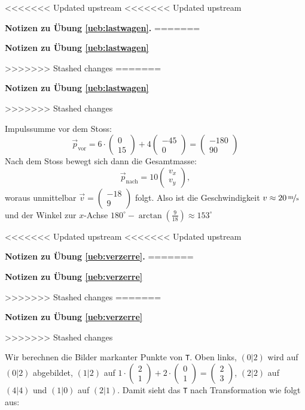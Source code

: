 \documentclass[%
11pt,%
twoside,%
titlepage,%
<<<<<<< Updated upstream
<<<<<<< Updated upstream
german,%
=======
swissgerman,%
>>>>>>> Stashed changes
=======
swissgerman,%
>>>>>>> Stashed changes
headsepline%
]{scrartcl}
\newcommand{\faReturnGray}{\textcolor{gray}{\faMailReply}} %
\newcommand{\faReturnGray}{\textcolor{gray}{\faMailReply}} %
\theoremstyle{definition}
\theoremstyle{plain}
\newcommand{\concatueb}[1]{ueb:#1}%
\newcommand{\concatlsg}[1]{lsg:#1}%
\newenvironment{lsg}[1]{%
<<<<<<< Updated upstream
<<<<<<< Updated upstream
    \par\noindent\textbf{Notizen zu Übung \ref{\concatueb{#1}}.}%
    \label{\concatlsg{#1}}
=======
    \par\noindent\textbf{Notizen zu Übung \ref{\concatueb{#1}}}\label{\concatlsg{#1}}
    \hfill\hyperref[\concatueb{#1}]{\faReturnGray}\par %
>>>>>>> Stashed changes
=======
    \par\noindent\textbf{Notizen zu Übung \ref{\concatueb{#1}}}\label{\concatlsg{#1}}
    \hfill\hyperref[\concatueb{#1}]{\faReturnGray}\par %
>>>>>>> Stashed changes
}{%
    \par%
}
\begin{document}
\begin{lsg}{lastwagen}
    Impulssumme vor dem Stoss:
    $$\vec{p}_{\text{vor}}=6\cdot\begin{pmatrix}
        0\\15
    \end{pmatrix}+4\begin{pmatrix}
        -45\\0
    \end{pmatrix}=\begin{pmatrix}
        -180\\90
    \end{pmatrix}$$
    Nach dem Stoss bewegt sich dann die Gesamtmasse:
    $$\vec{p}_{\text{nach}}=10\begin{pmatrix}
        v_x\\ v_y
    \end{pmatrix},$$
    woraus unmittelbar $\vec{v}=\begin{pmatrix}
        -18\\9
    \end{pmatrix}$ folgt. Also ist die Geschwindigkeit $v\approx\unitfrac[20]{m}{s}$ und der Winkel zur $x$-Achse $180^\circ-\arctan(\frac{9}{18})\approx153^\circ$
\end{lsg}
\begin{lsg}{verzerre}
    Wir berechnen die Bilder markanter Punkte von \texttt{T}. Oben links, $(0|2)$ wird auf $(0|2)$ abgebildet, $(1|2)$ auf $1\cdot\begin{pmatrix}
        2\\1
    \end{pmatrix}+2\cdot\begin{pmatrix}
        0\\1
    \end{pmatrix}=\begin{pmatrix}
        2\\3
    \end{pmatrix}$, $(2|2)$ auf $(4|4)$ und $(1|0)$ auf $(2|1)$. Damit sieht das \texttt{T} nach Transformation wie folgt aus:

    \begin{center}
\end{center}
\end{lsg}
\end{document}
